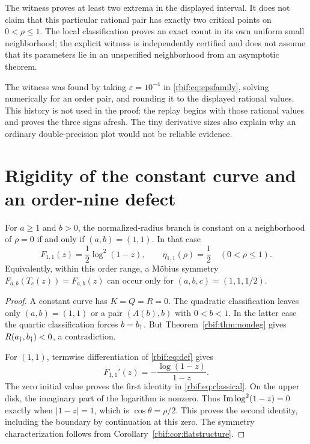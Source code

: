 \begin{remark}
The witness proves at least two extrema in the displayed interval. It
does not claim that this particular rational pair has exactly two
critical points on $0<\rho\le1$. The local classification proves an exact
count in its own uniform small neighborhood; the explicit witness is
independently certified and does not assume that its parameters lie in
an unspecified neighborhood from an asymptotic theorem.
\end{remark}

The witness was found by taking $\varepsilon=10^{-4}$ in
\eqref{rbif:eq:epsfamily}, solving numerically for an order pair, and
rounding it to the displayed rational values. This history is not used
in the proof: the replay begins with those rational values and proves
the three signs afresh. The tiny derivative sizes also explain why an
ordinary double-precision plot would not be reliable evidence.

\section{Rigidity of the constant curve and an order-nine defect}
\label{rbif:sec:rigidity}
\begin{theorem}
\label{rbif:thm:rigidity}
For $a\ge1$ and $b>0$, the normalized-radius branch is constant on a
neighborhood of $\rho=0$ if and only if $(a,b)=(1,1)$.
In that case
\begin{equation}
 F_{1,1}(z)=\frac12\log^2(1-z),\qquad
 \eta_{1,1}(\rho)=\frac12\quad(0<\rho\le1).
 \label{rbif:eq:classical}
\end{equation}
Equivalently, within this order range, a M\"obius symmetry
$F_{a,b}(T_c(z))=F_{a,b}(z)$ can occur only for $(a,b,c)=(1,1,1/2)$.
\end{theorem}
\begin{proof}
A constant curve has $K=Q=R=0$. The quadratic classification leaves
only $(a,b)=(1,1)$ or a pair $(A(b),b)$ with $0<b<1$.
In the latter case the quartic classification forces $b=b_\dagger$.
But Theorem~\ref{rbif:thm:nondeg} gives $R(a_\dagger,b_\dagger)<0$, a
contradiction.

For $(1,1)$, termwise differentiation of \eqref{rbif:eq:def} gives
\[
 F_{1,1}'(z)=-\frac{\log(1-z)}{1-z}.
\]
The zero initial value proves the first identity in
\eqref{rbif:eq:classical}. On the upper disk, the imaginary part of the
logarithm is nonzero. Thus $\operatorname{Im}\log^2(1-z)=0$ exactly when
$|1-z|=1$, which is $\cos\theta=\rho/2$. This proves the second
identity, including the boundary by continuation at this zero.
The symmetry characterization follows from
Corollary~\ref{rbif:cor:flatstructure}.
\end{proof}

